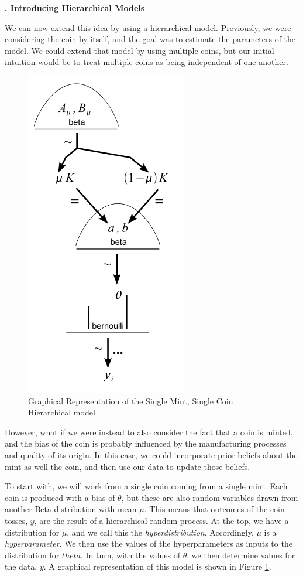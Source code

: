 \documentclass[10pt, a4paper]{article}
\newcounter{wssection}
\newcommand{\worksheetsection}[1]{
\vspace{10mm}
\stepcounter{wssection}
\noindent \Large \textbf{\thewssection. #1} \normalsize
\vspace{3mm}
}
\begin{document}
\worksheetsection{Introducing Hierarchical Models}

\noindent
We can now extend this idea by using a hierarchical model. Previously,
we were considering the coin by itself, and the goal was to estimate
the parameters of the model. We could extend that model by using
multiple coins, but our initial intuition would be to treat multiple
coins as being independent of one another.

\begin{figure}[h]
\begin{center}
\includegraphics{hierarchical_singlemint_singlecoin.png}
\caption{\label{fig_hiersingsing}
Graphical Representation of the Single Mint, Single Coin
Hierarchical model}
\end{center}
\end{figure}


However, what if we were instead to also consider the fact that a coin
is minted, and the bias of the coin is probably influenced by the
manufacturing processes and quality of its origin. In this case, we
could incorporate prior beliefs about the mint as well the coin, and
then use our data to update those beliefs.

To start with, we will work from a single coin coming from a single
mint. Each coin is produced with a bias of $\theta$, but these are
also random variables drawn from another Beta distribution with mean
$\mu$. This means that outcomes of the coin tosses, $y$, are the
result of a hierarchical random process. At the top, we have a
distribution for $\mu$, and we call this the
\emph{hyperdistribution}. Accordingly, $\mu$ is a
\emph{hyperparameter}. We then use the values of the hyperparameters
as inputs to the distribution for $theta$. In turn, with the values of
$\theta$, we then determine values for the data, $y$. A graphical
representation of this model is shown in Figure \ref{fig_hiersingsing}.
\end{document}
